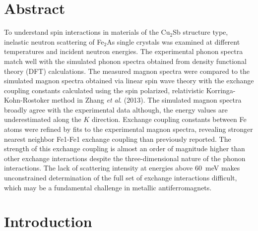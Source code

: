 \documentclass[letterpaper,10pt,doublespacing,edeposit]{uiucthesis2020}
\begin{document}
\begin{mainmatter}
\section{Abstract}
To understand spin interactions in materials of the Cu$_2$Sb structure type, inelastic neutron scattering of Fe$_2$As single crystals was examined at different temperatures and incident neutron energies. The experimental phonon spectra match well with the simulated phonon spectra obtained from density functional theory (DFT) calculations. The measured magnon spectra were compared to the simulated magnon spectra obtained via linear spin wave theory with the exchange coupling constants calculated using the spin polarized, relativistic Korringa-Kohn-Rostoker method in Zhang \emph{et al}. (2013). The simulated magnon spectra broadly agree with the experimental data although, the energy values are underestimated along the $K$ direction. Exchange coupling constants between Fe atoms were refined by fits to the experimental magnon spectra, revealing stronger nearest neighbor Fe1-Fe1 exchange coupling than previously reported. The strength of this exchange coupling is almost an order of magnitude higher than other exchange interactions despite the three-dimensional nature of the phonon interactions. The lack of scattering intensity at energies above 60~meV makes unconstrained determination of the full set of exchange interactions difficult, which may be a fundamental challenge in metallic antiferromagnets.




\section{Introduction} 


\end{mainmatter}
\end{document}
